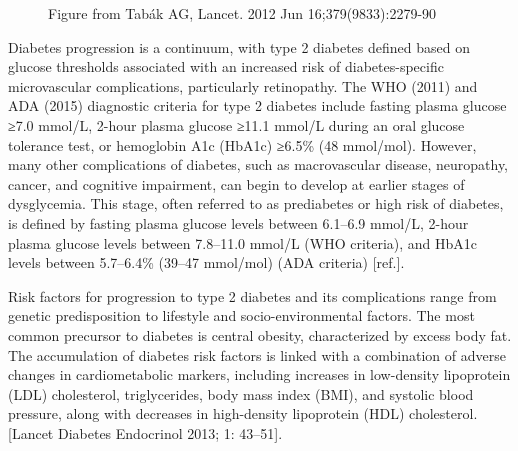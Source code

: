 \documentclass[
  a4paper,
  headsepline=true,
  open=any]{scrbook}
\begin{document}
\begin{figure}

\begin{minipage}[t]{\linewidth}

{\centering 


\caption{Figure from Tabák AG, Lancet. 2012 Jun 16;379(9833):2279-90}

}

\end{minipage}%

\end{figure}

Diabetes progression is a continuum, with type 2 diabetes defined based
on glucose thresholds associated with an increased risk of
diabetes-specific microvascular complications, particularly retinopathy.
The WHO (2011) and ADA (2015) diagnostic criteria for type 2 diabetes
include fasting plasma glucose ≥7.0 mmol/L, 2-hour plasma glucose ≥11.1
mmol/L during an oral glucose tolerance test, or hemoglobin A1c (HbA1c)
≥6.5\% (48 mmol/mol). However, many other complications of diabetes,
such as macrovascular disease, neuropathy, cancer, and cognitive
impairment, can begin to develop at earlier stages of dysglycemia. This
stage, often referred to as prediabetes or high risk of diabetes, is
defined by fasting plasma glucose levels between 6.1--6.9 mmol/L, 2-hour
plasma glucose levels between 7.8--11.0 mmol/L (WHO criteria), and HbA1c
levels between 5.7--6.4\% (39--47 mmol/mol) (ADA criteria) {[}ref.{]}.

Risk factors for progression to type 2 diabetes and its complications
range from genetic predisposition to lifestyle and socio-environmental
factors. The most common precursor to diabetes is central obesity,
characterized by excess body fat. The accumulation of diabetes risk
factors is linked with a combination of adverse changes in
cardiometabolic markers, including increases in low-density lipoprotein
(LDL) cholesterol, triglycerides, body mass index (BMI), and systolic
blood pressure, along with decreases in high-density lipoprotein (HDL)
cholesterol. {[}Lancet Diabetes Endocrinol 2013; 1: 43--51{]}.
\end{document}
